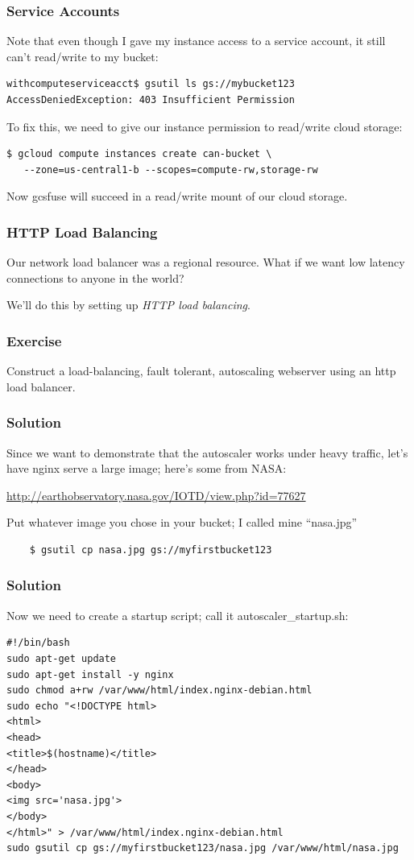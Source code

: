 \documentclass[9pt]{beamer}
\begin{document}
\begin{frame}[fragile]
\frametitle{Service Accounts}
Note that even though I gave my instance access to a service account, it still can't read/write to my bucket:
\begin{verbatim}
withcomputeserviceacct$ gsutil ls gs://mybucket123
AccessDeniedException: 403 Insufficient Permission
\end{verbatim}
To fix this, we need to give our instance permission to read/write cloud storage:
\begin{verbatim}
$ gcloud compute instances create can-bucket \
   --zone=us-central1-b --scopes=compute-rw,storage-rw
\end{verbatim}
Now gcsfuse will succeed in a read/write mount of our cloud storage.
\end{frame}


\begin{frame}[fragile]
  \frametitle{HTTP Load Balancing}
  Our network load balancer was a regional resource. What if we want low latency connections to anyone in the world?

  We'll do this by setting up \emph{HTTP load balancing}.
\end{frame}

\begin{frame}[fragile]
  \frametitle{Exercise}
  Construct a load-balancing, fault tolerant, autoscaling webserver using an http load balancer.
\end{frame}

\begin{frame}[fragile]
  \frametitle{Solution}
  Since we want to demonstrate that the autoscaler works under heavy traffic, let's have nginx serve a large image; here's some from NASA:

  \href{http://earthobservatory.nasa.gov/IOTD/view.php?id=77627}{http://earthobservatory.nasa.gov/IOTD/view.php?id=77627}

  Put whatever image you chose in your bucket; I called mine ``nasa.jpg''
  \begin{verbatim}
    $ gsutil cp nasa.jpg gs://myfirstbucket123
  \end{verbatim}
\end{frame}

\begin{frame}[fragile]
  \frametitle{Solution}
  Now we need to create a startup script; call it autoscaler\_startup.sh:
  \begin{verbatim}
#!/bin/bash
sudo apt-get update
sudo apt-get install -y nginx
sudo chmod a+rw /var/www/html/index.nginx-debian.html
sudo echo "<!DOCTYPE html>
<html>
<head>
<title>$(hostname)</title>
</head>
<body>
<img src='nasa.jpg'>
</body>
</html>" > /var/www/html/index.nginx-debian.html
sudo gsutil cp gs://myfirstbucket123/nasa.jpg /var/www/html/nasa.jpg
  \end{verbatim}
\end{frame}
\end{document}
